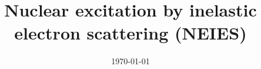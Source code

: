 \documentclass[fleqn]{book}
\begin{document}
\title{Nuclear excitation by inelastic electron scattering (NEIES)}
\date{\today}
\tableofcontents







\appendix
%

\end{document}

